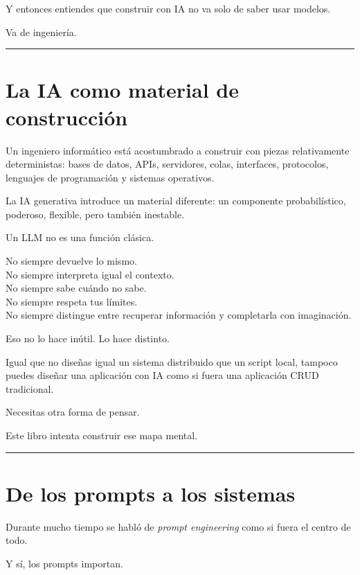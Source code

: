 Y entonces entiendes que construir con IA no va solo de saber usar
modelos.

Va de ingeniería.

\begin{center}\rule{0.5\linewidth}{0.5pt}\end{center}

\section{La IA como material de
construcción}\label{la-ia-como-material-de-construcciuxf3n}

Un ingeniero informático está acostumbrado a construir con piezas
relativamente deterministas: bases de datos, APIs, servidores, colas,
interfaces, protocolos, lenguajes de programación y sistemas operativos.

La IA generativa introduce un material diferente: un componente
probabilístico, poderoso, flexible, pero también inestable.

Un LLM no es una función clásica.

No siempre devuelve lo mismo.\\
No siempre interpreta igual el contexto.\\
No siempre sabe cuándo no sabe.\\
No siempre respeta tus límites.\\
No siempre distingue entre recuperar información y completarla con
imaginación.

Eso no lo hace inútil. Lo hace distinto.

Igual que no diseñas igual un sistema distribuido que un script local,
tampoco puedes diseñar una aplicación con IA como si fuera una
aplicación CRUD tradicional.

Necesitas otra forma de pensar.

Este libro intenta construir ese mapa mental.

\begin{center}\rule{0.5\linewidth}{0.5pt}\end{center}

\section{De los prompts a los
sistemas}\label{de-los-prompts-a-los-sistemas}

Durante mucho tiempo se habló de \emph{prompt engineering} como si fuera
el centro de todo.

Y sí, los prompts importan.

